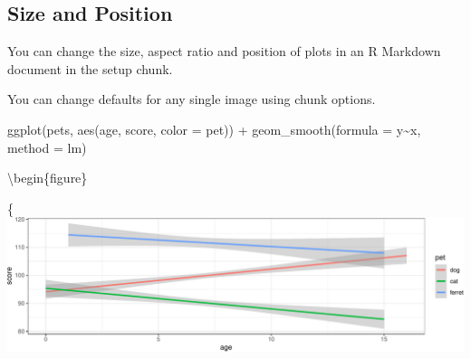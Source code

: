 \documentclass[
  oneside]{book}
\newenvironment{Shaded}{\begin{snugshade}}{\end{snugshade}}
\newcommand{\AttributeTok}[1]{\textcolor[rgb]{0.77,0.63,0.00}{#1}}
\newcommand{\CommentTok}[1]{\textcolor[rgb]{0.56,0.35,0.01}{\textit{#1}}}
\newcommand{\DecValTok}[1]{\textcolor[rgb]{0.00,0.00,0.81}{#1}}
\newcommand{\FunctionTok}[1]{\textcolor[rgb]{0.00,0.00,0.00}{#1}}
\newcommand{\NormalTok}[1]{#1}
\newcommand{\SpecialCharTok}[1]{\textcolor[rgb]{0.00,0.00,0.00}{#1}}
\newcommand{\StringTok}[1]{\textcolor[rgb]{0.31,0.60,0.02}{#1}}
\begin{document}
\hypertarget{custom-size}{%
\subsection{Size and Position}\label{custom-size}}

You can change the size, aspect ratio and position of plots in an R Markdown document in the setup chunk.

\begin{Shaded}
\end{Shaded}

You can change defaults for any single image using chunk options.

\begin{Shaded}
\begin{Highlighting}[]
\FunctionTok{ggplot}\NormalTok{(pets, }\FunctionTok{aes}\NormalTok{(age, score, }\AttributeTok{color =}\NormalTok{ pet)) }\SpecialCharTok{+}
  \FunctionTok{geom\_smooth}\NormalTok{(}\AttributeTok{formula =}\NormalTok{ y}\SpecialCharTok{\textasciitilde{}}\NormalTok{x, }\AttributeTok{method =}\NormalTok{ lm)}
\end{Highlighting}
\end{Shaded}

\textbackslash begin\{figure\}

\{\centering \includegraphics[width=1\linewidth]{images/fig-chunk-example1-out-1}
\end{document}

